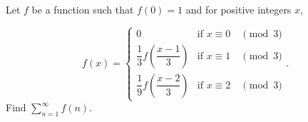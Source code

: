 Let $f$ be a function such that $f(0)=1$ and for positive integers $x$,

$$f(x)=\begin{cases}
0&\textrm{if }x\equiv 0\quad\pmod{3}\\
\dfrac{1}{3}f\left(\dfrac{x-1}{3}\right)&\textrm{if }x\equiv 1\quad\pmod{3}\\
\dfrac{1}{9}f\left(\dfrac{x-2}{3}\right)&\textrm{if }x\equiv 2\quad\pmod{3}
\end{cases}.$$Find $\sum^{\infty}_{n=1}f(n)$.

